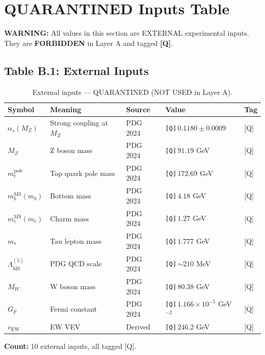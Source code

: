 \documentclass[11pt,a4paper]{article}
\newcommand{\Qnum}[1]{\textcolor{red!70!black}{\texttt{[Q]}}\,#1}
\theoremstyle{definition}
\begin{document}
\section{QUARANTINED Inputs Table}
\label{sec:inputs}

\begin{quarantinebox}
\textbf{WARNING:} All values in this section are EXTERNAL experimental inputs.
They are \textbf{FORBIDDEN} in Layer A and tagged \textbf{[Q]}.
\end{quarantinebox}

\subsection{Table B.1: External Inputs}
\label{subsec:table-b1}

\begin{table}[ht]
\centering
\caption{External inputs --- QUARANTINED (NOT USED in Layer A).}
\label{tab:external-inputs}
\begin{tabular}{lllll}
\toprule
Symbol & Meaning & Source & Value & Tag \\
\midrule
$\alpha_s(M_Z)$ & Strong coupling at $M_Z$ & PDG 2024 & \Qnum{$0.1180 \pm 0.0009$} & [Q] \\
$M_Z$ & Z boson mass & PDG 2024 & \Qnum{$91.19$ GeV} & [Q] \\
$m_t^{\text{pole}}$ & Top quark pole mass & PDG 2024 & \Qnum{$172.69$ GeV} & [Q] \\
$m_b^{\overline{\text{MS}}}(m_b)$ & Bottom mass & PDG 2024 & \Qnum{$4.18$ GeV} & [Q] \\
$m_c^{\overline{\text{MS}}}(m_c)$ & Charm mass & PDG 2024 & \Qnum{$1.27$ GeV} & [Q] \\
$m_\tau$ & Tau lepton mass & PDG 2024 & \Qnum{$1.777$ GeV} & [Q] \\
$\Lambda_{\overline{\text{MS}}}^{(5)}$ & PDG QCD scale & PDG 2024 & \Qnum{$\sim 210$ MeV} & [Q] \\
$M_W$ & W boson mass & PDG 2024 & \Qnum{$80.38$ GeV} & [Q] \\
$G_F$ & Fermi constant & PDG 2024 & \Qnum{$1.166 \times 10^{-5}$ GeV$^{-2}$} & [Q] \\
$v_{\text{EW}}$ & EW VEV & Derived & \Qnum{$246.2$ GeV} & [Q] \\
\bottomrule
\end{tabular}
\end{table}

\textbf{Count:} 10 external inputs, all tagged [Q].
\end{document}
